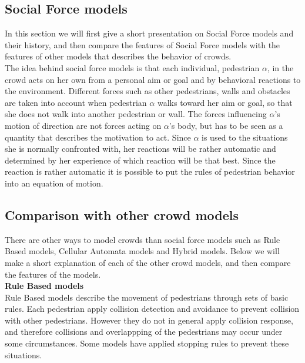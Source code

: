 \subsection{Social Force models}

In this section we will first give a short presentation on Social Force models and their history,
and then compare the features of Social Force models with the features of other models that describes
the behavior of crowds.
\\

The idea behind social force models is that each individual, pedestrian $\alpha$, in the crowd acts 
on her own from a personal aim or goal and by behavioral reactions to the environment. 
Different forces such as other pedestrians, walls and obstacles are taken into account 
when pedestrian $\alpha$ walks toward her aim or goal, so that she does not walk 
into another pedestrian or wall. The forces influencing $\alpha$'s motion 
of direction are not forces acting on $\alpha$'s body, but has to be seen as a quantity 
that describes the motivation to act. Since $\alpha$ is used to the situations 
she is normally confronted with, her reactions will be rather automatic and 
determined by her experience of which reaction will be that best. Since the reaction 
is rather automatic it is possible to put the rules of pedestrian behavior into an equation 
of motion.\cite{social-force}

\subsection{Comparison with other crowd models}
There are other ways to model crowds than social force models such as Rule Based models, 
Cellular Automata models and Hybrid models. Below we will make a short explanation of each of the 
other crowd models, and then compare the features of the models.\\												%

\textbf{Rule Based models}\\
Rule Based models describe the movement of pedestrians through sets of basic rules. Each 
pedestrian apply collision detection and avoidance to prevent collision with other pedestrians. 
However they do not in general apply collision response, and therefore collisions and overlappping 
of the pedestrians may occur under some circumstances. Some models have applied stopping 
rules to prevent these situations.\cite{Comparison}

